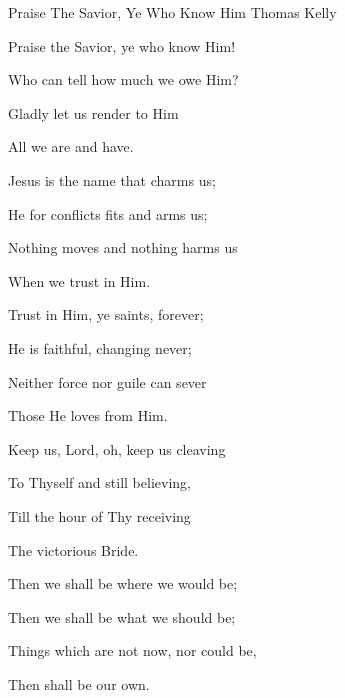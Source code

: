 \documentclass[12pt]{book}
\begin{document}
\begin{song}{Praise The Savior, Ye Who Know Him}{}
  {\SBPubDom}
  {Thomas Kelly}
  {}
  {}

  \begin{SBVerse}
    Praise the Savior, ye who know Him!

    Who can tell how much we owe Him?

    Gladly let us render to Him

    All we are and have.
  \end{SBVerse}

  \begin{SBVerse}
    Jesus is the name that charms us;

    He for conflicts fits and arms us;

    Nothing moves and nothing harms us

    When we trust in Him.
  \end{SBVerse}

  \begin{SBVerse}
    Trust in Him, ye saints, forever;

    He is faithful, changing never;

    Neither force nor guile can sever

    Those He loves from Him.
  \end{SBVerse}

  \begin{SBVerse}
    Keep us, Lord, oh, keep us cleaving

    To Thyself and still believing,

    Till the hour of Thy receiving

    The victorious Bride.
  \end{SBVerse}

  \begin{SBVerse}
    Then we shall be where we would be;

    Then we shall be what we should be;

    Things which are not now, nor could be,

    Then shall be our own.
  \end{SBVerse}
\end{song}
\end{document}
